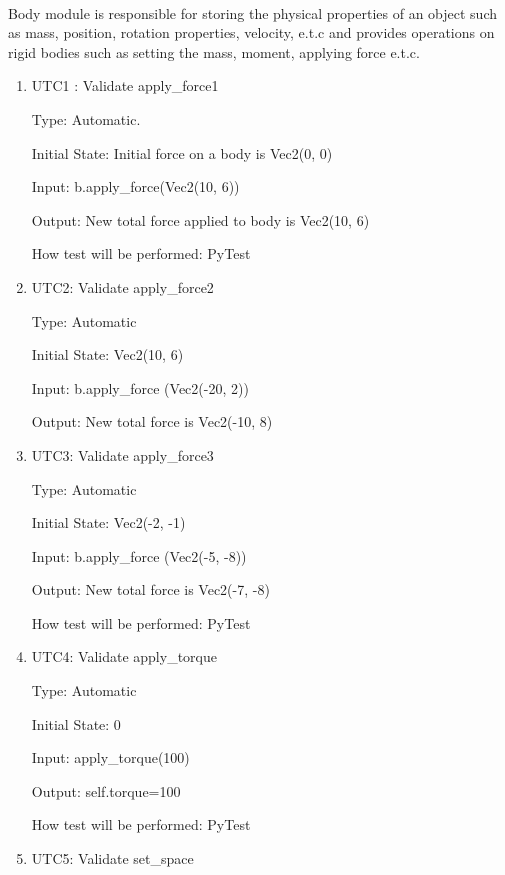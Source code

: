 \documentclass[12pt, titlepage]{article}
\begin{document}
\paragraph{}
Body module is responsible for storing the physical properties of an object such as mass, position, rotation properties, velocity, e.t.c and provides operations on rigid bodies such as setting the mass, moment, applying force e.t.c.
\begin{enumerate}
	

\item{UTC1} {: Validate apply\_force1 \\}

Type: Automatic.
					
Initial State: Initial force on a body is Vec2(0, 0)
					
Input: b.apply\_force(Vec2(10, 6))
					
Output: New total force applied to body is Vec2(10, 6)
					
How test will be performed: PyTest 
					
\item{UTC2}{: Validate apply\_force2\\}

Type: Automatic
					
Initial State: Vec2(10, 6)
					
Input: b.apply\_force (Vec2(-20, 2))
					
Output: New total force is Vec2(-10, 8)

\item{UTC3}{: Validate apply\_force3\\}

Type: Automatic

Initial State: Vec2(-2, -1)

Input: b.apply\_force (Vec2(-5, -8))

Output: New total force is Vec2(-7, -8)
					
How test will be performed: PyTest

\item{UTC4}{: Validate apply\_torque\\}

Type: Automatic

Initial State: 0

Input: apply\_torque(100)

Output: self.torque=100

How test will be performed: PyTest

\item{UTC5}{: Validate set\_space\\}


\end{enumerate}
\end{document}
